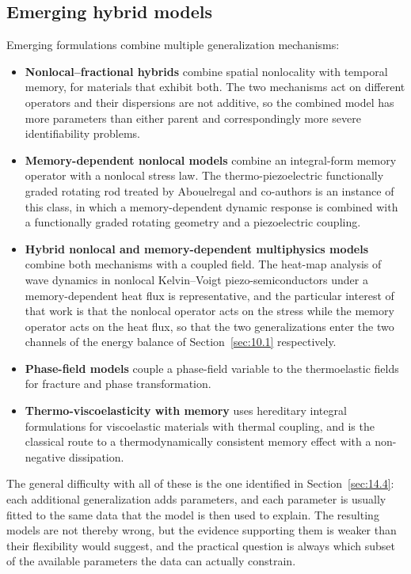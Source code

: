 \subsection{Emerging hybrid models}
\label{sec:11.4}

Emerging formulations combine multiple generalization mechanisms:

\begin{itemize}
\item \textbf{Nonlocal--fractional hybrids} combine spatial nonlocality with temporal memory, for materials that exhibit both. The two mechanisms act on different operators and their dispersions are not additive, so the combined model has more parameters than either parent and correspondingly more severe identifiability problems.
\item \textbf{Memory-dependent nonlocal models} combine an integral-form memory operator with a nonlocal stress law. The thermo-piezoelectric functionally graded rotating rod treated by Abouelregal and co-authors \cite{Abouelregal2023} is an instance of this class, in which a memory-dependent dynamic response is combined with a functionally graded rotating geometry and a piezoelectric coupling.
\item \textbf{Hybrid nonlocal and memory-dependent multiphysics models} combine both mechanisms with a coupled field. The heat-map analysis of wave dynamics in nonlocal Kelvin--Voigt piezo-semiconductors under a memory-dependent heat flux \cite{Gupta2026HeatMap} is representative, and the particular interest of that work is that the nonlocal operator acts on the stress while the memory operator acts on the heat flux, so that the two generalizations enter the two channels of the energy balance of Section~\ref{sec:10.1} respectively.
\item \textbf{Phase-field models} couple a phase-field variable to the thermoelastic fields for fracture and phase transformation.
\item \textbf{Thermo-viscoelasticity with memory} uses hereditary integral formulations for viscoelastic materials with thermal coupling, and is the classical route to a thermodynamically consistent memory effect with a non-negative dissipation.
\end{itemize}

The general difficulty with all of these is the one identified in Section~\ref{sec:14.4}: each additional generalization adds parameters, and each parameter is usually fitted to the same data that the model is then used to explain. The resulting models are not thereby wrong, but the evidence supporting them is weaker than their flexibility would suggest, and the practical question is always which subset of the available parameters the data can actually constrain.

